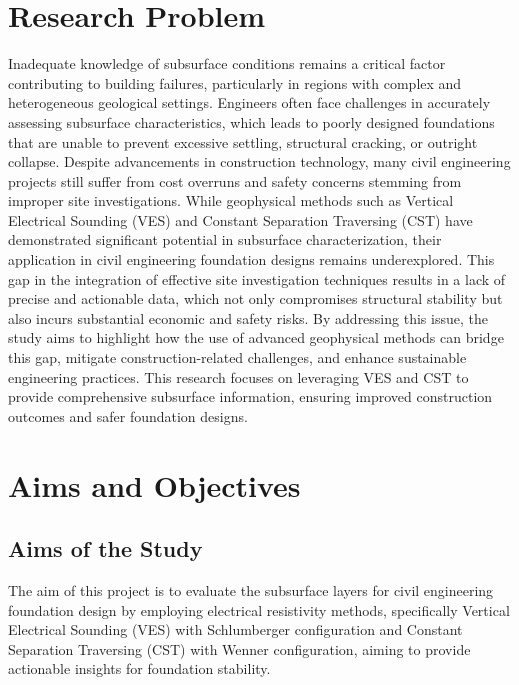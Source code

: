 \documentclass[12pt,a4paper]{report}
\begin{document}
\section{Research Problem}
Inadequate knowledge of subsurface conditions remains a critical factor contributing to building failures, particularly in regions with complex and heterogeneous geological settings. Engineers often face challenges in accurately assessing subsurface characteristics, which leads to poorly designed foundations that are unable to prevent excessive settling, structural cracking, or outright collapse. Despite advancements in construction technology, many civil engineering projects still suffer from cost overruns and safety concerns stemming from improper site investigations.
While geophysical methods such as Vertical Electrical Sounding (VES) and Constant Separation Traversing (CST) have demonstrated significant potential in subsurface characterization, their application in civil engineering foundation designs remains underexplored. This gap in the integration of effective site investigation techniques results in a lack of precise and actionable data, which not only compromises structural stability but also incurs substantial economic and safety risks. By addressing this issue, the study aims to highlight how the use of advanced geophysical methods can bridge this gap, mitigate construction-related challenges, and enhance sustainable engineering practices. This research focuses on leveraging VES and CST to provide comprehensive subsurface information, ensuring improved construction outcomes and safer foundation designs.

\section{Aims and Objectives}

\subsection{Aims of the Study}
The aim of this project is to evaluate the subsurface layers for civil engineering foundation design by employing electrical resistivity methods, specifically Vertical Electrical Sounding (VES) with Schlumberger configuration and Constant Separation Traversing (CST) with Wenner configuration, aiming to provide actionable insights for foundation stability.
\end{document}

